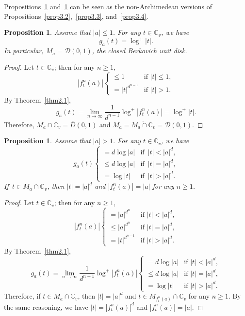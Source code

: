 \documentclass[11pt]{amsart}
\numberwithin{equation}{section}
\theoremstyle{plain}
\newtheorem{prop}[thm]{Proposition}
\theoremstyle{definition}
\theoremstyle{remark}
\newcommand{\C}{\mathbb C}
\begin{document}
Propositions~\ref{prop3.8} and~\ref{prop3.9} can be seen as the
non-Archimedean versions of Propositions~\ref{prop3.2},~\ref{prop3.3},
and~\ref{prop3.4}.

\begin{prop}\label{prop3.8}
  Assume that $|a|\leq1$. For any $t\in\C_{v}$,
we have
\[
g_{a}(t)=\log^{+}|t|.
\]
In particular, $M_{a}=\mathcal{D}(0,1)$, the closed Berkovich unit
disk.
\end{prop}

\begin{proof}
Let $t\in\C_{v}$; then for any $n\geq1$,
\[
|f_{t}^{n}(a)|\begin{cases}
\leq1 & \text{if }|t|\leq1,\\
=|t|^{d^{n-1}} & \text{if }|t|>1.
\end{cases}
\]
By Theorem~\ref{thm2.1},
\[
g_{a}(t)=\lim_{n\to\infty}\frac{1}{d^{n-1}}\log^{+}|f_{t}^{n}(a)|=\log^{+}|t|.
\]
Therefore, $M_{a}\cap\C_{v}=\overline{D}(0,1)$ and $M_{a}=\overline{M_{a}\cap\C_{v}}=\mathcal{D}(0,1)$.
\end{proof}

\begin{prop}\label{prop3.9}
Assume that $|a|>1$. For any $t\in\C_{v}$, we have
\[
g_{a}(t)\begin{cases}
=d\log|a| & \text{if }\,|t|<|a|^{d},\\
\leq d\log|a| & \text{if }\,|t|=|a|^{d},\\
=\log|t| & \text{if }\,|t|>|a|^{d}.
\end{cases}
\]
If\, $t\in M_{a}\cap\C_{v}$, then $|t|=|a|^{d}$ and $|f_{t}^{n}(a)|=|a|$
for any $n\geq1$.
\end{prop}

\begin{proof}
Let $t\in\C_{v}$; then for any $n\geq1$,
\[
|f_{t}^{n}(a)|\begin{cases}
=|a|^{d^{n}} & \text{if }|t|<|a|^{d},\\
\leq|a|^{d^{n}} & \text{if }|t|=|a|^{d},\\
=|t|^{d^{n-1}} & \text{if }|t|>|a|^{d}.
\end{cases}
\]
By Theorem~\ref{thm2.1},
\[
g_{a}(t)=\lim_{n\to\infty}\frac{1}{d^{n-1}}\log^{+}|f_{t}^{n}(a)|\begin{cases}
=d\log|a| & \text{if }|t|<|a|^{d},\\
\leq d\log|a| & \text{if }|t|=|a|^{d},\\
=\log|t| & \text{if }|t|>|a|^{d}.
\end{cases}
\]
Therefore, if $t\in M_{a}\cap\C_{v}$, then $|t|=|a|^{d}$
and $t\in M_{f_{t}^{n}(a)}\cap\C_{v}$ for any $n\geq1$.
By the same reasoning, we have $|t|=|f_{t}^{n}(a)|^{d}$ and $|f_{t}^{n}(a)|=|a|$.
\end{proof}
\end{document}

